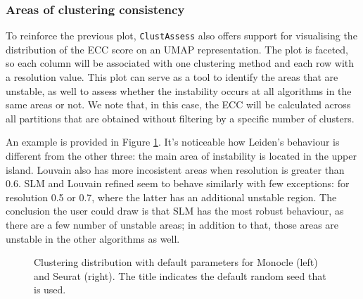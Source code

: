 \subsubsection{Areas of clustering consistency}
To reinforce the previous plot, \verb|ClustAssess| also offers support for visualising the distribution of the ECC score on an UMAP representation. The plot is faceted, so each column will be associated with one clustering method and each row with a resolution value. This plot can serve as a tool to identify the areas that are unstable, as well to assess whether the instability occurs at all algorithms in the same areas or not. We note that, in this case, the ECC will be calculated across all partitions that are obtained without filtering by a specific number of clusters.

An example is provided in Figure \ref{fig:ca-clust-dif-facet}. It's noticeable how Leiden's behaviour is different from the other three: the main area of instability is located in the upper island. Louvain also has more incosistent areas when resolution is greater than 0.6. SLM and Louvain refined seem to behave similarly with few exceptions: for resolution 0.5 or 0.7, where the latter has an additional unstable region. The conclusion the user could draw is that SLM has the most robust behaviour, as there are a few number of unstable areas; in addition to that, those areas are unstable in the other algorithms as well.

\begin{figure}[H]
    \centering
    \caption{\label{fig:ca-clust-dif-facet}Clustering distribution with default parameters for Monocle (left) and Seurat (right). The title indicates the default random seed that is used.}
\end{figure}

